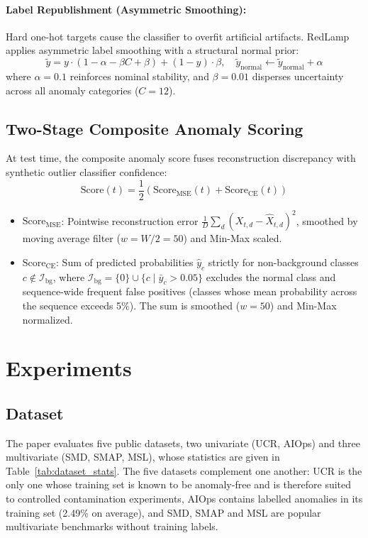 \documentclass[sigconf,nonacm]{acmart}
\begin{document}
\paragraph{Label Republishment (Asymmetric Smoothing):} Hard one-hot targets cause the classifier to overfit artificial artifacts. RedLamp applies asymmetric label smoothing with a structural normal prior:
\begin{equation}
    \tilde{y} = y \cdot (1 - \alpha - \beta C + \beta) + (1 - y) \cdot \beta, \quad \tilde{y}_{\text{normal}} \leftarrow \tilde{y}_{\text{normal}} + \alpha
\end{equation}
where $\alpha = 0.1$ reinforces nominal stability, and $\beta = 0.01$ disperses uncertainty across all anomaly categories ($C=12$).

\subsection{Two-Stage Composite Anomaly Scoring}
At test time, the composite anomaly score fuses reconstruction discrepancy with synthetic outlier classifier confidence:
\begin{equation}
    \text{Score}(t) = \frac{1}{2}\left( \text{Score}_{\text{MSE}}(t) + \text{Score}_{\text{CE}}(t) \right)
\end{equation}
\begin{itemize}
    \item $\text{Score}_{\text{MSE}}$: Pointwise reconstruction error $\frac{1}{D}\sum_d (X_{t,d} - \hat{X}_{t,d})^2$, smoothed by moving average filter ($w = W/2 = 50$) and Min-Max scaled.
    \item $\text{Score}_{\text{CE}}$: Sum of predicted probabilities $\hat{y}_c$ strictly for non-background classes $c \notin \mathcal{I}_{\text{bg}}$, where $\mathcal{I}_{\text{bg}} = \{0\} \cup \{c \mid \bar{y}_c > 0.05\}$ excludes the normal class and sequence-wide frequent false positives (classes whose mean probability across the sequence exceeds 5\%). The sum is smoothed ($w=50$) and Min-Max normalized.
\end{itemize}

\section{Experiments}

\subsection{Dataset}
The paper evaluates five public datasets, two univariate (UCR, AIOps) and three multivariate (SMD, SMAP, MSL), whose statistics are given in Table~\ref{tab:dataset_stats}. The five datasets complement one another: UCR is the only one whose training set is known to be anomaly-free and is therefore suited to controlled contamination experiments, AIOps contains labelled anomalies in its training set (2.49\% on average), and SMD, SMAP and MSL are popular multivariate benchmarks without training labels.
\end{document}

